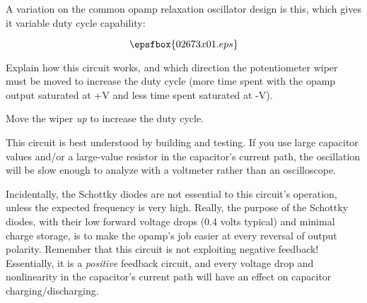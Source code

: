 

A variation on the common opamp relaxation oscillator design is this, which gives it variable duty cycle capability:

$$\epsfbox{02673x01.eps}$$

Explain how this circuit works, and which direction the potentiometer wiper must be moved to increase the duty cycle (more time spent with the opamp output saturated at +V and less time spent saturated at -V).







Move the wiper {\it up} to increase the duty cycle.







This circuit is best understood by building and testing.  If you use large capacitor values and/or a large-value resistor in the capacitor's current path, the oscillation will be slow enough to analyze with a voltmeter rather than an oscilloscope.

Incidentally, the Schottky diodes are not essential to this circuit's operation, unless the expected frequency is very high.  Really, the purpose of the Schottky diodes, with their low forward voltage drops (0.4 volts typical) and minimal charge storage, is to make the opamp's job easier at every reversal of output polarity.  Remember that this circuit is not exploiting negative feedback!  Essentially, it is a {\it positive} feedback circuit, and every voltage drop and nonlinearity in the capacitor's current path will have an effect on capacitor charging/discharging.




